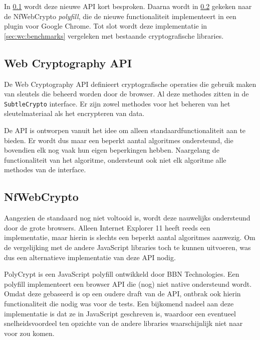 \npar In \ref{sec:wc:web_cryptography_api} wordt deze nieuwe API kort besproken. Daarna wordt in \ref{sec:wc:nfwebcrypto} gekeken naar de NfWebCrypto \textit{polyfill}, die de nieuwe functionaliteit implementeert in een plugin voor Google Chrome. Tot slot wordt deze implementatie in \ref{sec:wc:benchmarks} vergeleken met bestaande cryptografische libraries.

\subsection{Web Cryptography API~\cite{sleevi_watson_web_cryptography_api}}
\label{sec:wc:web_cryptography_api}

De Web Cryptography API definieert cryptografische operaties die gebruik maken van sleutels die beheerd worden door de browser. Al deze methodes zitten in de \texttt{SubtleCrypto} interface. Er zijn zowel methodes voor het beheren van het sleutelmateriaal als het encrypteren van data.

\npar De API is ontworpen vanuit het idee om alleen standaardfunctionaliteit aan te bieden. Er wordt dus maar een beperkt aantal algoritmes ondersteund, die bovendien elk nog vaak hun eigen beperkingen hebben.\cite{mail:sleevi_algorithms_and_referenced_documents} Naargelang de functionaliteit van het algoritme, ondersteunt ook niet elk algoritme alle methodes van de interface.

\subsection{NfWebCrypto}
\label{sec:wc:nfwebcrypto}

Aangezien de standaard nog niet voltooid is, wordt deze nauwelijks ondersteund door de grote browsers.\cite{site:html5test_web_cryptography_api} Alleen Internet Explorer 11 heeft reeds een implementatie, maar hierin is slechts een beperkt aantal algoritmes aanwezig.\cite{site:microsoft_web_cryptography} Om de vergelijking met de andere JavaScript libraries toch te kunnen uitvoeren, was dus een alternatieve implementatie van deze API nodig.

\npar PolyCrypt is een JavaScript polyfill ontwikkeld door BBN Technologies.\cite{site:polycrypt} Een polyfill implementeert een browser API die (nog) niet native ondersteund wordt. Omdat deze gebaseerd is op een oudere draft van de API, ontbrak ook hierin functionaliteit die nodig was voor de tests. Een bijkomend nadeel aan deze implementatie is dat ze in JavaScript geschreven is, waardoor een eventueel snelheidsvoordeel ten opzichte van de andere libraries waarschijnlijk niet naar voor zou komen.

